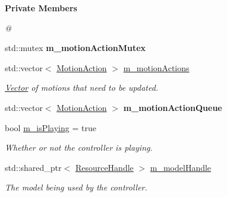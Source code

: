 \begin{Indent}\textbf{ Private Members}\par
{\em @ }\begin{DoxyCompactItemize}
\item 
\mbox{\label{classrev_1_1_animation_controller_a1aa3603739628c4968a3ddde8ce6248f}} 
std\+::mutex {\bfseries m\+\_\+motion\+Action\+Mutex}
\item 
\mbox{\label{classrev_1_1_animation_controller_a73a988d1702f3d6fef6306490ed02b3c}} 
std\+::vector$<$ \mbox{\hyperlink{structrev_1_1_motion_action}{Motion\+Action}} $>$ \mbox{\hyperlink{classrev_1_1_animation_controller_a73a988d1702f3d6fef6306490ed02b3c}{m\+\_\+motion\+Actions}}
\begin{DoxyCompactList}\small\item\em \mbox{\hyperlink{classrev_1_1_vector}{Vector}} of motions that need to be updated. \end{DoxyCompactList}\item 
\mbox{\label{classrev_1_1_animation_controller_a9da58a34e14c344b5ffb336b05afb179}} 
std\+::vector$<$ \mbox{\hyperlink{structrev_1_1_motion_action}{Motion\+Action}} $>$ {\bfseries m\+\_\+motion\+Action\+Queue}
\item 
\mbox{\label{classrev_1_1_animation_controller_acdb883e1b3c0079d95f0d08cfae16eaa}} 
bool \mbox{\hyperlink{classrev_1_1_animation_controller_acdb883e1b3c0079d95f0d08cfae16eaa}{m\+\_\+is\+Playing}} = true
\begin{DoxyCompactList}\small\item\em Whether or not the controller is playing. \end{DoxyCompactList}\item 
\mbox{\label{classrev_1_1_animation_controller_a98e6393e0b10b57d2b1e4c6c616a9978}} 
std\+::shared\+\_\+ptr$<$ \mbox{\hyperlink{classrev_1_1_resource_handle}{Resource\+Handle}} $>$ \mbox{\hyperlink{classrev_1_1_animation_controller_a98e6393e0b10b57d2b1e4c6c616a9978}{m\+\_\+model\+Handle}}
\begin{DoxyCompactList}\small\item\em The model being used by the controller. \end{DoxyCompactList}\item 

\end{DoxyCompactItemize}
\end{Indent}
